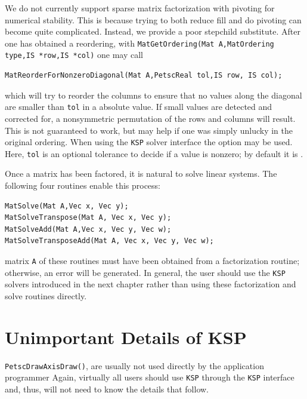 {{We do not currently support sparse matrix factorization with pivoting
for numerical stability. This is because trying to both reduce fill
and do pivoting can become quite complicated. Instead, we provide a
poor stepchild substitute. After one has obtained a reordering, with
\lstinline{MatGetOrdering(Mat A,MatOrdering type,IS *row,IS *col)} one
may call
\begin{lstlisting}
MatReorderForNonzeroDiagonal(Mat A,PetscReal tol,IS row, IS col);
\end{lstlisting}
which will try to reorder the columns to ensure that no values along
the diagonal are smaller than \lstinline{tol} in a absolute value. If small
values are detected and corrected for, a nonsymmetric
permutation of the rows and columns will result. This is not guaranteed to work,
but may help if one was simply unlucky in the original ordering.
When using the \lstinline{KSP} solver interface
the option  
may be used.  Here, \lstinline{tol}
is an optional tolerance to decide if a value is nonzero; by default it
is .

Once a matrix has been factored, it is natural to solve linear systems.
The following four routines enable this process: 
\begin{lstlisting}
MatSolve(Mat A,Vec x, Vec y);
MatSolveTranspose(Mat A, Vec x, Vec y);
MatSolveAdd(Mat A,Vec x, Vec y, Vec w);
MatSolveTransposeAdd(Mat A, Vec x, Vec y, Vec w);
\end{lstlisting}
matrix
\lstinline{A} of these routines must have been obtained from a
factorization routine; otherwise, an error will be generated.
In general, the user should use the \lstinline{KSP} solvers introduced in the
next chapter rather than using these factorization and solve routines
directly.

\section{Unimportant Details of KSP}
\lstinline{PetscDrawAxisDraw()}, are usually
not used directly by the application programmer
Again, virtually all users should use \lstinline{KSP} through the \lstinline{KSP} interface
and, thus, will not need to know the details that follow.

}}
